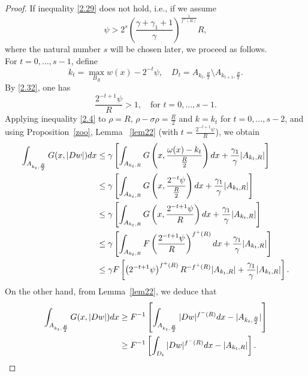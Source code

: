 \documentclass[10pt,a4paper]{amsart}
\begin{document}
\begin{proof}
If inequality \eqref{2.29} does not hold, i.e., if we assume
\begin{equation}\label{2.32}
\psi > 2^s \left( \frac{\gamma + \gamma_1 + 1}{\gamma} \right)^{\frac{1}{f^+(R)}} R,
\end{equation}
where the natural number \( s \) will be chosen later, we proceed as follows.\\
For \( t = 0, \ldots, s - 1 \), define
\[
k_t = \max_{B_R} w(x) - 2^{-t} \psi, \quad D_t = A_{k_t, \frac{R}{2}} \setminus A_{k_{t+1}, \frac{R}{2}}.
\]
By \eqref{2.32}, one has  
\begin{equation}\label{2.32m}
\frac{ 2^{-t+1}\psi}{R}> 1,\quad \text{for } t = 0, \ldots, s - 1.
\end{equation}
Applying inequality \eqref{2.4} to \(\rho = R\), \(\rho - \sigma \rho = \frac{R}{2}\) and \(k = k_t\) for \(t = 0, \ldots, s - 2\), and using Proposition~\ref{zoo}, Lemma ~\ref{lem22} (with $t= \frac{2^{-t+1}\psi}{R} $), we  obtain
\begin{align}\label{Ge1}
\begin{split}
\int_{A_{k_t, \frac{R}{2}}} G(x,|Dw|){\rm d}x &\leq \gamma\left[\int_{A_{k_t, R}}G\left(x,\frac{\omega(x)-k_t}{\frac{R}{2}}\right){\rm d}x +\frac{\gamma_1}{\gamma} |A_{k_t, R}|\right]\\
& \leq\gamma\left[\int_{A_{k_t, R}}G\left(x,\frac{2^{-t}\psi}{\frac{R}{2}}\right){\rm d}x +\frac{\gamma_1}{\gamma} |A_{k_t, R}|\right]\\
&\leq \gamma\left[\int_{A_{k_t, R}}G\left(x,\frac{2^{-t+1}\psi}{R}\right){\rm d}x+\frac{\gamma_1}{\gamma} |A_{k_t, R}|\right]\\
& \leq \gamma \left[\int_{A_{k_t, R}}F \left(\frac{2^{-t+1}\psi}{R}\right)^{f^+(R)}{\rm d}x+\frac{\gamma_1}{\gamma} |A_{k_t, R}|\right]\\
& \leq \gamma F\left[\left(2^{-t+1}\psi\right)^{f^+(R)}R^{-f^+(R)}|A_{k_t, R}|+\frac{\gamma_1}{\gamma} |A_{k_t, R}|\right].
\end{split}
\end{align}
On the other hand, from Lemma~\ref{lem22}, we deduce that
\begin{align}\label{Ge2}
\begin{split}
    \int_{A_{k_t, \frac{R}{2}}} G(x,|Dw|){\rm d}x &\geq F^{-1}\left[\int_{A_{k_t, \frac{R}{2}}} |Dw|^{f^-(R)}{\rm d}x - |A_{k_t, \frac{R}{2}}|\right] \\
    &\geq F^{-1}\left[\int_{D_{t}} |Dw|^{f^-(R)}{\rm d}x - |A_{k_t, R}|\right].
   \end{split}

\end{align}
\end{proof}
\end{document}
